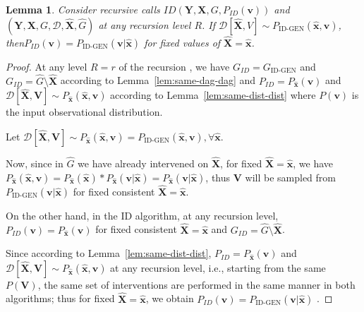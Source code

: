 \documentclass{article}
\newcommand{\red}{\textcolor{red}}
\newcommand{\X}{\mathbf{X}}
\newcommand{\Xp}{{\hat{\mathbf{X}}}}
\newcommand{\xp}{{\hat{\mathbf{x}}}}
\newcommand{\Gp}{{\hat{{G}}}}
\newcommand{\Y}{\mathbf{Y}}
\newcommand{\V}{\mathbf{V}}
\newcommand{\vb}{\mathbf{v}}
\newcommand{\data}{\mathcal{D}}
\newcommand{\idgen}{\text{ID-GEN}\xspace}
\newcommand{\idgenpar}{\idgen$(\mathbf{Y}, \mathbf{X},  G,  \data, {\Xp}, \Gp)$\xspace}
\theoremstyle{plain}
\newtheorem{lemma}[theorem]{Lemma}
\theoremstyle{definition}
\theoremstyle{remark}
\begin{document}
	\begin{lemma}
		\label{lem:same-dist-graph}
		Consider recursive calls  $ID(\Y, \X, G, P_{ID}(\vb))$ and  \idgenpar at any recursion level $R$. 
		If $\data[\Xp, V] \sim P_{\idgen}(\xp, \vb)$, then$P_{ID}(\vb) = P_{\idgen}(\vb|\xp)$
		for fixed values of $\Xp=\xp$.
	\end{lemma}
	\begin{proof}
		At any level $R=r$ of the recursion , we have  $G_{ID} = G_{\idgen}$ and $G_{ID}= \Gp \setminus \Xp$ according to Lemma~\ref{lem:same-dag-dag}
		and $P_{ID} = P_{\xp}(\vb)$ and $\data[\Xp, \V] \sim P_{\xp}(\xp, \vb)$ according to Lemma~\ref{lem:same-dist-dist} where $P(\vb)$ is the input observational distribution.
		
		Let $\data[\Xp, \V] \sim P_{\xp}(\xp, \vb) = P_{\idgen}(\xp, \vb), \forall \xp$.
		
		Now, since in $\Gp$ we have already intervened on $\Xp$,
		for fixed $\Xp= \xp$, we have
		$P_{\xp}(\xp, \vb) = P_{\xp}(\xp) *P_{\xp}(\vb|\xp) = P_{\xp}(\vb|\xp)$, 
		thus $\V$ will be sampled from $P_{\idgen}(\vb|\xp)$ for fixed consistent $\Xp= \xp$. 
		
		
		On the other hand, in the ID algorithm, at any recursion level, $P_{ID}(\vb) = P_{\xp}(\vb)$ for fixed consistent $\Xp= \xp$ and $G_{ID}= \Gp \setminus \Xp$. 

  
  Since according to Lemma~\ref{lem:same-dist-dist},	$P_{ID} = P_{\xp}(\vb)$ and $\data[\Xp, \V] \sim P_{\xp}(\xp, \vb)$ at any recursion level, i.e., starting from the same $P(\V)$, the same set of interventions are performed in the same manner in both algorithms; thus for fixed $\Xp= \xp$, we obtain $P_{ID}(\vb)= P_{\idgen}(\vb|\xp)$ .  
		
		
		
		
		
		
		

\end{proof}
\end{document}
